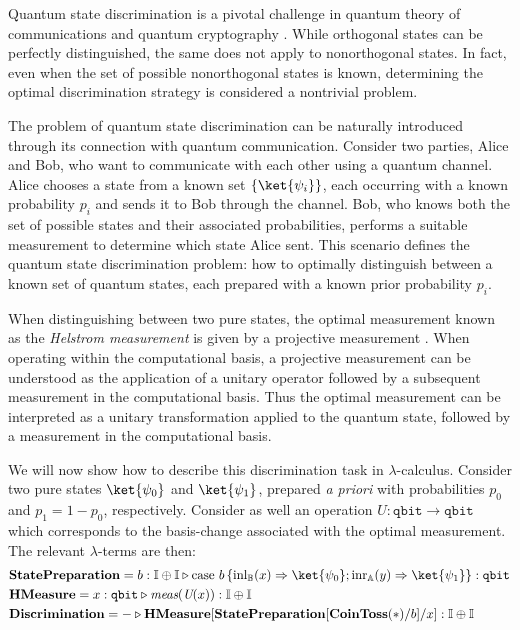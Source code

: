 \begin{example} \label{ex:quantum_state_discrimination_syntax}

Quantum state discrimination is a pivotal challenge in 
 quantum theory of communications \cite{barnett2009qinfo,watrous2018theory} and  quantum cryptography \cite{Gisin02qcripto}. 
While orthogonal states can be perfectly distinguished, the same does not apply
to nonorthogonal states. In fact, even when the set of possible nonorthogonal
states is known, determining the optimal discrimination strategy is considered
a nontrivial problem.

The problem of quantum state discrimination can be naturally introduced through its connection with quantum communication. Consider two parties, Alice and Bob, who want to communicate with each other using a quantum channel. Alice chooses a state from a known set $\{\ket{\psi_i}\}$, each occurring with a known probability $p_i$ and sends it to Bob through the channel. Bob, who knows both the set of possible states and their associated probabilities, performs a suitable measurement to determine which state Alice sent. This scenario defines the quantum state discrimination problem: how to optimally distinguish between a known set of quantum states, each prepared with a known prior probability $p_i$.

When distinguishing between two pure states, the optimal measurement known as the \emph{Helstrom measurement} is given by a projective measurement
\cite{barnett2009qinfo}.  When operating within the computational basis, a
projective measurement can be understood as the application of a unitary
operator followed by a subsequent measurement in the computational basis. Thus
the optimal measurement can be interpreted as a unitary transformation applied
to the quantum state, followed by a measurement in the computational basis. 

We will now show how to describe this discrimination task in
$\lambda$-calculus.  Consider two pure states $\ket{\psi_0}$ and
$\ket{\psi_1}$, prepared \emph{a priori} with probabilities $p_0$ and $p_1 = 1-p_0$,
respectively. Consider as well an operation $U : \mathtt{qbit} \to \mathtt{qbit}$ which
corresponds to the basis-change associated with the optimal measurement.
The relevant $\lambda$-terms are then:
\begin{align*}
  &\textbf{StatePreparation} =  b: \typeI \oplus \typeI  \vljud  \text{case } b\,
  \{\inl_{\typeB}(x) \Rightarrow \ket{\psi_0} ; \inr_{\typeA}(y) \Rightarrow \ket{\psi_1}\}: \mathtt{qbit} \\
  &\textbf{HMeasure} =  x : \mathtt{qbit} \vljud \emph{meas} (\emph{U}(x)): \typeI \oplus \typeI \\
  &\textbf{Discrimination} = - \vljud \textbf{HMeasure} [ \textbf{StatePreparation} [\textbf{CoinToss}(*)/ b] / x] : \typeI\oplus \typeI
\end{align*}


\end{example}
